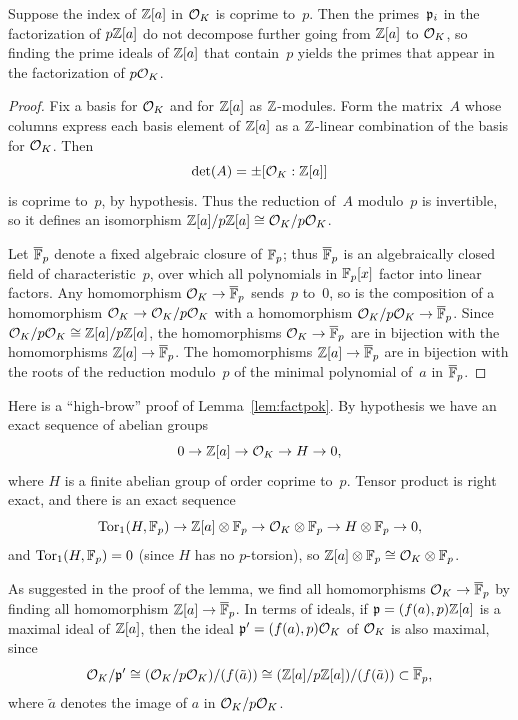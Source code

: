 \begin{lemma}\label{lem:factpok}
Suppose the index of $\mathbb{Z}[a]$ in $\mathcal{O}_K$ is coprime to~$p$.  Then
the primes~$\mathfrak{p}_i$ in the factorization of $p\mathbb{Z}[a]$ do not
decompose further going from $\mathbb{Z}[a]$ to $\mathcal{O}_K$, so finding the
prime ideals of $\mathbb{Z}[a]$ that contain~$p$ yields the primes
that appear in the factorization of $p\mathcal{O}_K$.
\end{lemma}
\begin{proof}
Fix a basis for $\mathcal{O}_K$ and for $\mathbb{Z}[a]$ as $\mathbb{Z}$-modules.
Form the matrix~$A$ whose columns express each basis element
of $\mathbb{Z}[a]$ as a $\mathbb{Z}$-linear combination of the basis for $\mathcal{O}_K$.
Then 
$$
\det(A) = \pm [\mathcal{O}_K:\mathbb{Z}[a]]
$$ 
is coprime to~$p$, by hypothesis.  Thus the reduction of~$A$
modulo~$p$ is invertible, so it defines an isomorphism
$\mathbb{Z}[a]/p\mathbb{Z}[a] \cong \mathcal{O}_K/p\mathcal{O}_K$. 

Let $\overline{\mathbb{F}}_p$ denote a fixed algebraic closure of $\mathbb{F}_p$; thus $\overline{\mathbb{F}}_p$
is an algebraically closed field of characteristic~$p$, over which
all polynomials in $\mathbb{F}_p[x]$ factor into linear factors.
Any homomorphism $\mathcal{O}_K\to \overline{\mathbb{F}}_p$ sends~$p$ to~$0$, so is the composition of a homomorphism $\mathcal{O}_K \to \mathcal{O}_K/p\mathcal{O}_K$ with a homomorphism
$\mathcal{O}_K/p\mathcal{O}_K \to \overline{\mathbb{F}}_p$.  Since $\mathcal{O}_K/p\mathcal{O}_K \cong
\mathbb{Z}[a]/p\mathbb{Z}[a]$, the homomorphisms $\mathcal{O}_K\to \overline{\mathbb{F}}_p$ are in bijection
with the homomorphisms $\mathbb{Z}[a]\to \overline{\mathbb{F}}_p$.  The homomorphisms
$\mathbb{Z}[a]\to\overline{\mathbb{F}}_p$ are in bijection with the roots of the reduction
modulo~$p$ of the minimal polynomial of~$a$ in $\overline{\mathbb{F}}_p$.
\end{proof}

\begin{remark}
Here is a ``high-brow'' proof of Lemma~\ref{lem:factpok}.
By hypothesis we have an exact sequence
of abelian groups
$$ 0 \to \mathbb{Z}[a]\to \mathcal{O}_K \to H \to 0,$$
where $H$ is a finite abelian group of order coprime 
to~$p$.  Tensor product is right exact, and there is
an exact sequence
$$
   \operatorname{Tor}_1(H,\mathbb{F}_p) \to \mathbb{Z}[a]\otimes\mathbb{F}_p \to \mathcal{O}_K\otimes\mathbb{F}_p \to H\otimes\mathbb{F}_p \to 0,
$$
and $\operatorname{Tor}_1(H,\mathbb{F}_p) = 0$ (since $H$ has no $p$-torsion), 
so $\mathbb{Z}[a]\otimes\mathbb{F}_p\cong \mathcal{O}_K\otimes\mathbb{F}_p$.
\end{remark}

As suggested in the proof of the lemma, we find all homomorphisms
$\mathcal{O}_K\to \overline{\mathbb{F}}_p$ by finding all homomorphism $\mathbb{Z}[a]\to \overline{\mathbb{F}}_p$.  In
terms of ideals, if $\mathfrak{p}=(f(a),p)\mathbb{Z}[a]$ is a maximal ideal of $\mathbb{Z}[a]$,
then the ideal $\mathfrak{p}'=(f(a),p)\mathcal{O}_K$ of $\mathcal{O}_K$ is also maximal, since
$$\mathcal{O}_K/\mathfrak{p}'\cong (\mathcal{O}_K/p\mathcal{O}_K)/(f(\tilde{a}))
\cong (\mathbb{Z}[a]/p\mathbb{Z}[a]) / (f(\tilde{a})) \subset \overline{\mathbb{F}}_p,$$
where $\tilde{a}$ denotes the image of $a$ in $\mathcal{O}_K/p\mathcal{O}_K$.

